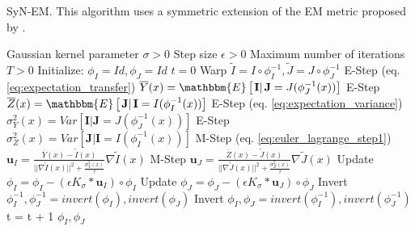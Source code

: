 \begin{algorithm}[h!]
\caption{SyN-EM. This algorithm uses a symmetric extension of the EM metric proposed by \cite{Arce-santana2014}.}\label{alg:SyNEM}
\begin{algorithmic}[1]
\REQUIRE Gaussian kernel parameter $\sigma>0$
\REQUIRE Step size $\epsilon>0$
\REQUIRE Maximum number of iterations $T>0$
\STATE Initialize: $\phi_{I} = Id, \phi_{J} = Id$
\STATE $t=0$
\REPEAT
    \STATE Warp $\tilde{I}  = I \circ \phi_{I}^{-1}, \tilde{J} = J \circ \phi_{J}^{-1}$
    \STATE E-Step (eq. \eqref{eq:expectation_transfer}) $\overline{Y}(x) = \mathbbm{E}\left[\left.\mathbf{I}\right| \mathbf{J}= J(\phi_{J}^{-1}(x))\right]$
    \STATE E-Step $\overline{Z}(x) = \mathbbm{E}\left[\left.\mathbf{J}\right| \mathbf{I}= I(\phi_{I}^{-1}(x))\right]$
    \STATE E-Step (eq. \eqref{eq:expectation_variance}) $\sigma^{2}_{Y}(x) = Var\left[\left.\mathbf{I}\right| \mathbf{J}= J(\phi_{J}^{-1}(x))\right]$
    \STATE E-Step $\sigma^{2}_{Z}(x) = Var\left[\left.\mathbf{J}\right| \mathbf{I}= I(\phi_{I}^{-1}(x))\right]$
    \STATE M-Step (eq. \eqref{eq:euler_lagrange_step1}) $\mathbf{u}_{I} = \frac{\overline{Y}(x) - \tilde{I}(x)}{||\nabla \tilde{I}(x)||^{2} + \frac{\sigma_{Y}^{2}(x)}{\tau}}\nabla \tilde{I}(x)$
    \STATE M-Step $\mathbf{u}_{J} = \frac{\overline{Z}(x) - \tilde{J}(x)}{||\nabla \tilde{J}(x)||^{2} + \frac{\sigma_{Z}^{2}(x)}{\tau}}\nabla \tilde{J}(x)$
    \STATE Update $\phi_{I} = \phi_{I} - \left(\epsilon K_{\sigma} \ast \mathbf{u}_{I} \right)\circ \phi_{I}$
    \STATE Update $\phi_{J} = \phi_{J} - \left(\epsilon K_{\sigma} \ast \mathbf{u}_{J} \right)\circ \phi_{J}$
    \STATE Invert $\phi_{I}^{-1}, \phi_{J}^{-1} = invert(\phi_{I}), invert(\phi_{J})$
    \STATE Invert $\phi_{I}, \phi_{J} = invert(\phi_{I}^{-1}), invert(\phi_{J}^{-1})$
    \STATE t = t + 1
\RETURN $\phi_{I}, \phi_{J}$
\end{algorithmic}
\end{algorithm}


